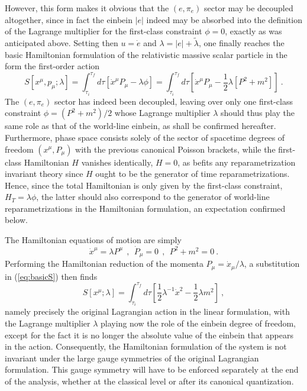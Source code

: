 \documentclass[a4paper,11pt]{article}
\begin{document}
However, this form makes it obvious that the $(e,\pi_e)$ sector may be 
decoupled altogether, since in fact the einbein $|e|$ indeed may be absorbed 
into the definition of the Lagrange multiplier for the first-class constraint
$\phi=0$, exactly as was anticipated above. Setting then $u=\dot{e}$ and
$\lambda=|e|+\tilde{\lambda}$, one finally reaches the basic Hamiltonian
formulation of the relativistic massive scalar particle in the form the
first-order action
\begin{equation}
S[x^\mu,p_\mu;\lambda]=\int_{\tau_i}^{\tau_f}d\tau
\left[\dot{x}^\mu P_\mu-\lambda\phi\right]=
\int_{\tau_i}^{\tau_f}d\tau\left[\dot{x}^\mu P_\mu-
\frac{1}{2}\lambda\left[P^2+m^2\right]\right]\ .
\label{eq:basicS}
\end{equation}
The $(e,\pi_e)$ sector has indeed been decoupled, leaving over only
one first-class constraint $\phi=(P^2+m^2)/2$ whose Lagrange multiplier
$\lambda$ should thus play the same role as that of the world-line einbein,
as shall be confirmed hereafter. Furthermore, phase space consists solely
of the sector of spacetime degrees of freedom $(x^\mu,P_\mu)$ with the
previous canonical Poisson brackets, while the first-class Hamiltonian $H$
vanishes identically, $H=0$, as befits any reparametrization invariant
theory since $H$ ought to be the generator of time reparametrizations.
Hence, since the total Hamiltonian is only given by the first-class
constraint, $H_T=\lambda\phi$, the latter should also correspond to the
generator of world-line reparametrizations in the Hamiltonian formulation,
an expectation confirmed below.

The Hamiltonian equations of motion are simply
\begin{equation}
\dot{x}^\mu=\lambda P^\mu\ \ ,\ \ \dot{P}_\mu=0\ \ ,\ \ P^2+m^2=0\ .
\end{equation}
Performing the Hamiltonian reduction of the momenta 
$P_\mu=\dot{x}_\mu/\lambda$, a substitution in (\ref{eq:basicS})
then finds
\begin{equation}
S[x^\mu;\lambda]=\int_{\tau_i}^{\tau_f}d\tau
\left[\frac{1}{2}\lambda^{-1}\dot{x}^2-\frac{1}{2}\lambda m^2\right]\ ,
\end{equation}
namely precisely the original Lagrangian action in the linear formulation,
with the Lagrange multiplier $\lambda$ playing now the role of the einbein
degree of freedom, except for the fact it is no longer the absolute value
of the einbein that appears in the action. Consequently, the Hamiltonian
formulation of the system is not invariant under the large gauge symmetries
of the original Lagrangian formulation. This gauge symmetry will have to be
enforced se\-pa\-ra\-te\-ly at the end of the analysis, whether at the 
classical level or after its canonical quantization.
\end{document}
